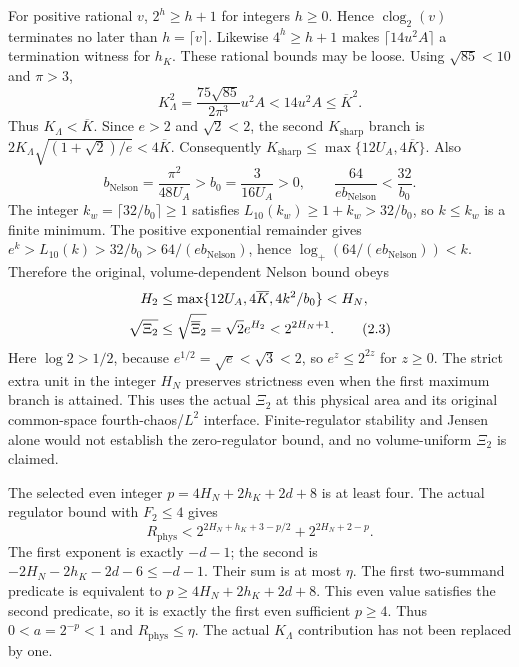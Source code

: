 For positive rational $v$, $2^h\ge h+1$ for integers $h\ge0$.
Hence $\operatorname{clog}_2(v)$ terminates no later than
$h=\lceil v\rceil$. Likewise $4^h\ge h+1$ makes
$\lceil14u^2 A\rceil$ a termination witness for $h_K$.
These rational bounds may be loose. Using $\sqrt{85}<10$ and $\pi>3$,
\[
 K_\Lambda^2=\frac{75\sqrt{85}}{2\pi^3}u^2 A
 <14u^2 A\le\overline K^2.
\]
Thus $K_\Lambda<\overline K$. Since $e>2$ and $\sqrt2<2$, the second
$K_{\mathrm{sharp}}$ branch is
$2K_\Lambda\sqrt{(1+\sqrt2)/e}<4\overline K$. Consequently
$K_{\mathrm{sharp}}\le\max\{12U_A,4\overline K\}$. Also
\[
 b_{\mathrm{Nelson}}=\frac{\pi^2}{48U_A}>b_0=\frac3{16U_A}>0,
 \qquad \frac{64}{e b_{\mathrm{Nelson}}}<\frac{32}{b_0}.
\]
The integer $k_w=\lceil32/b_0\rceil\ge1$ satisfies
$L_{10}(k_w)\ge1+k_w>32/b_0$, so $k\le k_w$ is a finite minimum.
The positive exponential remainder gives
$e^k>L_{10}(k)>32/b_0>64/(e b_{\mathrm{Nelson}})$, hence
$\log_+(64/(e b_{\mathrm{Nelson}}))<k$. Therefore the original,
volume-dependent Nelson bound obeys
\begin{align}
 H_2&\le\max\{12U_A,4\overline K,4k^2/b_0\}<H_N,\notag\\
 \sqrt{\Xi_2}&\le\sqrt{\overline\Xi_2}=\sqrt2 e^{H_2}
                         <2^{2H_N+1}.\tag{2.3}
\end{align}
Here $\log2>1/2$, because $e^{1/2}=\sqrt e<\sqrt3<2$, so
$e^z\le2^{2z}$ for $z\ge0$. The strict extra unit in the integer $H_N$
preserves strictness even when the first maximum branch is attained.
This uses the actual $\Xi_2$ at this physical area and its original
common-space fourth-chaos/$L^2$ interface. Finite-regulator stability and
Jensen alone would not establish the zero-regulator bound, and no
volume-uniform $\Xi_2$ is claimed.

The selected even integer $p=4H_N+2h_K+2d+8$ is at least four.
The actual regulator bound with $F_2\le4$ gives
\begin{equation}
 R_{\mathrm{phys}}<2^{2H_N+h_K+3-p/2}+2^{2H_N+2-p}.\tag{2.4}
\end{equation}
The first exponent is exactly $-d-1$; the second is
$-2H_N-2h_K-2d-6\le-d-1$. Their sum is at most $\eta$.
The first two-summand predicate is equivalent to
$p\ge4H_N+2h_K+2d+8$. This even value satisfies the second predicate,
so it is exactly the first even sufficient $p\ge4$.
Thus $0<a=2^{-p}<1$ and $R_{\mathrm{phys}}\le\eta$.
The actual $K_\Lambda$ contribution has not been replaced by one.

